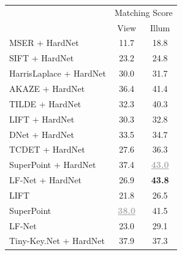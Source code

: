 \begin{table}[!tbh]
\vspace{-0.10cm}
\begin{center}
\begin{tabular}{lcc}
\hline
\noalign{\smallskip}
\multicolumn{1}{c}{} & \multicolumn{2}{c}{Matching Score} \\ 
\cline{2-3} \noalign{\smallskip}
\multicolumn{1}{c}{} & \multicolumn{1}{c}{View} & \multicolumn{1}{c}{Illum} \\
\noalign{\smallskip}
\hline
\noalign{\smallskip}
MSER \cite{MSER} + HardNet \cite{Mishchuk_Mishkin_NIPS17}   & 11.7 & 18.8 \\
SIFT \cite{SIFT} + HardNet \cite{Mishchuk_Mishkin_NIPS17}   & 23.2 & 24.8 \\
HarrisLaplace \cite{HarrisLaplace} + HardNet \cite{Mishchuk_Mishkin_NIPS17} & 30.0 & 31.7 \\
AKAZE \cite{AKAZE} + HardNet \cite{Mishchuk_Mishkin_NIPS17} & 36.4 & 41.4 \\
TILDE \cite{TILDE} + HardNet \cite{Mishchuk_Mishkin_NIPS17} & 32.3 & 40.3 \\
LIFT \cite{LIFT} + HardNet \cite{Mishchuk_Mishkin_NIPS17} & 30.3 & 32.8 \\
DNet \cite{Karel_Vedaldi_ECCV_16} + HardNet \cite{Mishchuk_Mishkin_NIPS17} & 33.5 & 34.7 \\
TCDET \cite{Zhang_Felix_CVPR_17} + HardNet \cite{Mishchuk_Mishkin_NIPS17} & 27.6 & 36.3 \\
SuperPoint \cite{detone2017superpoint} + HardNet \cite{Mishchuk_Mishkin_NIPS17} & 37.4 & \textbf{\textcolor{darkgray}{\underline{43.0}}} \\
LF-Net \cite{OnoSerra18} + HardNet \cite{Mishchuk_Mishkin_NIPS17} & 26.9 & \textbf{43.8} \\
\noalign{\smallskip}
\hline
\noalign{\smallskip}
LIFT \cite{LIFT} & 21.8 & 26.5 \\
SuperPoint \cite{detone2017superpoint} & \textbf{\textcolor{darkgray}{\underline{38.0}}} & 41.5 \\
LF-Net \cite{OnoSerra18} & 23.0 & 29.1 \\
\noalign{\smallskip}
\hline
\noalign{\smallskip}
Tiny-Key.Net + HardNet \cite{Mishchuk_Mishkin_NIPS17} & 37.9 & 37.3 \\

\end{tabular}
\end{center}
\end{table}
